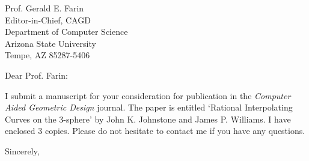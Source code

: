 \signature{John K. Johnstone}

\setlength{\oddsidemargin}{0pt}
\setlength{\evensidemargin}{0pt}
\setlength{\topmargin}{-0.4in}
\setlength{\textheight}{9.00in}
\setlength{\textwidth}{6.5in}
\setlength{\headsep}{.2in}


\begin{letter}
{Prof. Gerald E. Farin\\
Editor-in-Chief, CAGD\\
Department of Computer Science\\
Arizona State University\\
Tempe, AZ  85287-5406
}

\opening{Dear Prof. Farin:}

I submit a manuscript for your consideration for publication in the
{\em Computer Aided Geometric Design} journal.
The paper is entitled `Rational Interpolating Curves on the 3-sphere'
by John K. Johnstone and James P. Williams.
I have enclosed 3 copies.
Please do not hesitate to contact me if you have any questions.

\closing{Sincerely,}
\end{letter}


